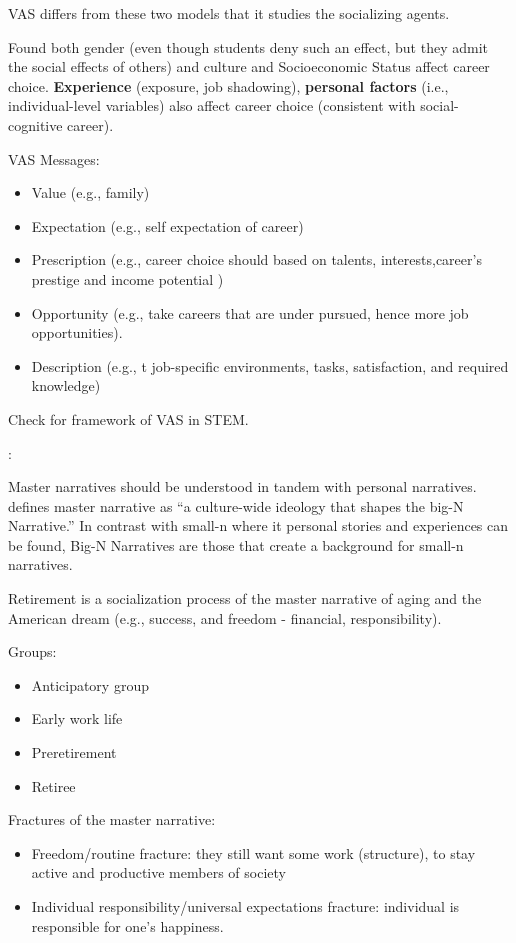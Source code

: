 \documentclass[
]{book}
\providecommand{\tightlist}{%
  \setlength{\itemsep}{0pt}\setlength{\parskip}{0pt}}
\begin{document}
VAS differs from these two models that it studies the socializing agents.

Found both gender (even though students deny such an effect, but they admit the social effects of others) and culture and Socioeconomic Status affect career choice.
\textbf{Experience} (exposure, job shadowing), \textbf{personal factors} (i.e., individual-level variables) also affect career choice (consistent with social-cognitive career).

VAS Messages:

\begin{itemize}
\tightlist
\item
  Value (e.g., family)
\item
  Expectation (e.g., self expectation of career)
\item
  Prescription (e.g., career choice should based on talents, interests,career's prestige and income potential )
\item
  Opportunity (e.g., take careers that are under pursued, hence more job opportunities).
\item
  Description (e.g., t job-specific environments, tasks, satisfaction, and required knowledge)
\end{itemize}

Check \citep[pp.107]{Myers_2010} for framework of VAS in STEM.

\citep{smith2012}:

Master narratives should be understood in tandem with personal narratives.
\citep[pp.209]{tannen2008} defines master narrative as ``a culture-wide ideology that shapes the big-N Narrative.'' In contrast with small-n where it personal stories and experiences can be found, Big-N Narratives are those that create a background for small-n narratives.

Retirement is a socialization process of the master narrative of aging and the American dream (e.g., success, and freedom - financial, responsibility).

Groups:

\begin{itemize}
\tightlist
\item
  Anticipatory group
\item
  Early work life
\item
  Preretirement
\item
  Retiree
\end{itemize}

Fractures of the master narrative:

\begin{itemize}
\tightlist
\item
  Freedom/routine fracture: they still want some work (structure), to stay active and productive members of society
\item
  Individual responsibility/universal expectations fracture: individual is responsible for one's happiness.
\end{itemize}
\end{document}
